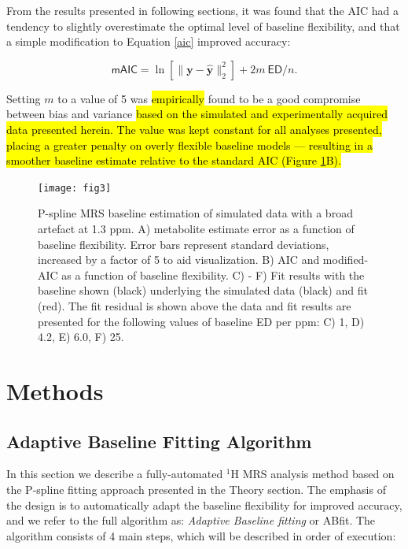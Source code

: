 \documentclass[num-refs]{wiley-article}
\newcommand{\revone}[2]{\hl{#1}\marginnote{\hl{#2}}}
\begin{document}
From the results presented in following sections, it was found that the AIC had a tendency to slightly overestimate the optimal level of baseline flexibility, and that a simple modification to Equation \ref{aic} improved accuracy:

\begin{equation}
  \textsf{mAIC} = \ln \left[ \|\mathbf{y} - \hat{\mathbf{y}}\|^{2}_{2} \right] + 2 m \ \textsf{ED} / n.
  \label{maic}
\end{equation}

Setting $m$ to a value of 5 was \revone{empirically}{R1.14} found to be a good compromise between bias and variance \revone{based on the simulated and experimentally acquired data presented herein. The value was kept constant for all  analyses presented, placing a greater penalty on overly flexible baseline models --- resulting in a smoother baseline estimate relative to the standard AIC (Figure \ref{mrs_bl_simple}B).}{R1.14}

\begin{figure}
  \begin{center}
    \texttt{[image: fig3]}
    \caption{P-spline MRS baseline estimation of simulated data with a broad artefact at 1.3 ppm. A) metabolite estimate error as a function of baseline flexibility. Error bars represent standard deviations, increased by a factor of 5 to aid visualization. B) AIC and modified-AIC as a function of baseline flexibility. C) - F) Fit results with the baseline shown (black) underlying the simulated data (black) and fit (red). The fit residual is shown above the data and fit results are presented for the following values of baseline ED per ppm: C) 1, D) 4.2, E) 6.0, F) 25.}
    \label{mrs_bl_simple}
  \end{center}
\end{figure}

\section{Methods}
\subsection{Adaptive Baseline Fitting Algorithm}
In this section we describe a fully-automated $^1\mathrm{H}$ MRS analysis method based on the P-spline fitting approach presented in the Theory section. The emphasis of the design is to automatically adapt the baseline flexibility for improved accuracy, and we refer to the full algorithm as: \textit{Adaptive Baseline fitting} or ABfit. The algorithm consists of 4 main steps, which will be described in order of execution:
\end{document}

